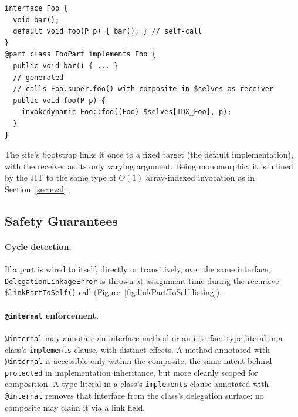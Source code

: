 \documentclass[acmsmall,nonacm]{acmart}
\theoremstyle{acmplain}
\newcommand{\code}[1]{\texttt{#1}}
\begin{document}
\begin{lstlisting}
interface Foo {
  void bar();
  default void foo(P p) { bar(); } // self-call
}
@part class FooPart implements Foo {
  public void bar() { ... }
  // generated
  // calls Foo.super.foo() with composite in $selves as receiver
  public void foo(P p) {
    invokedynamic Foo::foo((Foo) $selves[IDX_Foo], p);
  }
}
\end{lstlisting}

The site's bootstrap links it once to a fixed target (the default implementation), with the receiver as its only varying
argument. Being monomorphic, it is inlined by the JIT to the same type of $O(1)$ array-indexed invocation as in Section~\ref{sec:eval}.

\subsection{Safety Guarantees}
\label{subsec:safety}

\paragraph{Cycle detection.}
If a part is wired to itself, directly or transitively, over the same interface, \code{De\-le\-ga\-tion\-Link\-age\-Er\-ror}
is thrown at assignment time during the recursive \code{\$linkPartToSelf()} call (Figure~\ref{fig:linkPartToSelf-listing}).

\paragraph{\code{@internal} enforcement.}
\code{@internal} may annotate an interface method or an interface type literal in a class's \code{implements} clause, with
distinct effects. A method annotated with \code{@internal} is accessible only within the composite, the same intent behind
\code{protected} in implementation inheritance, but more cleanly scoped for composition. A type literal in a class's \code{implements}
clause annotated with \code{@internal} removes that interface from the class's delegation surface: no composite may claim
it via a link field.
\end{document}
